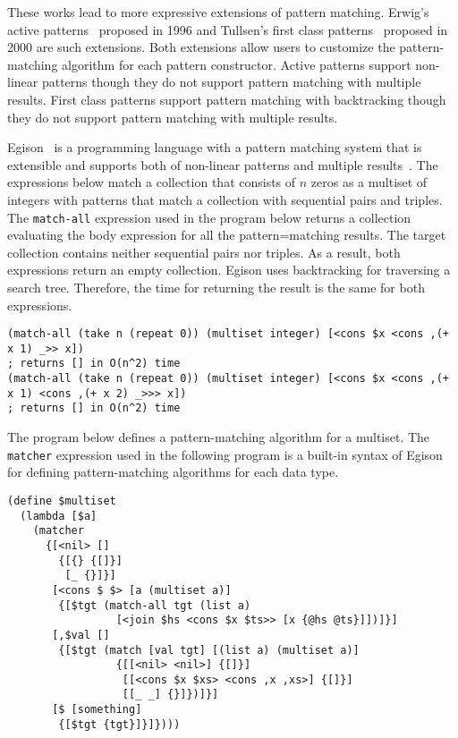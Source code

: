 \documentclass[acmlarge]{acmart}
\begin{document}
These works lead to more expressive extensions of pattern matching.
Erwig's active patterns~\cite{erwig1996active} proposed in 1996 and Tullsen's first class patterns~\cite{tullsen2000first} proposed in 2000 are such extensions.
Both extensions allow users to customize the pattern-matching algorithm for each pattern constructor.
Active patterns support non-linear patterns though they do not support pattern matching with multiple results.
First class patterns support pattern matching with backtracking though they do not support pattern matching with multiple results.

Egison~\cite{egisonWeb} is a programming language with a pattern matching system that is extensible and supports both of non-linear patterns and multiple results~\cite{egi2018aplas}.
The expressions below match a collection that consists of $n$ zeros as a multiset of integers with patterns that match a collection with sequential pairs and triples.
The \texttt{match-all} expression used in the program below returns a collection evaluating the body expression for all the pattern=matching results.
The target collection contains neither sequential pairs nor triples.
As a result, both expressions return an empty collection.
Egison uses backtracking for traversing a search tree.
Therefore, the time for returning the result is the same for both expressions.

\begin{lstlisting}[language=egison]
(match-all (take n (repeat 0)) (multiset integer) [<cons $x <cons ,(+ x 1) _>> x])
; returns [] in O(n^2) time
(match-all (take n (repeat 0)) (multiset integer) [<cons $x <cons ,(+ x 1) <cons ,(+ x 2) _>>> x])
; returns [] in O(n^2) time
\end{lstlisting}

\noindent The program below defines a pattern-matching algorithm for a multiset.
The \texttt{matcher} expression used in the following program is a built-in syntax of Egison for defining pattern-matching algorithms for each data type.

\begin{lstlisting}[language=egison]
(define $multiset
  (lambda [$a]
    (matcher
      {[<nil> []
        {[{} {[]}]
         [_ {}]}]
       [<cons $ $> [a (multiset a)]
        {[$tgt (match-all tgt (list a)
                 [<join $hs <cons $x $ts>> [x {@hs @ts}]])]}]
       [,$val []
        {[$tgt (match [val tgt] [(list a) (multiset a)]
                 {[[<nil> <nil>] {[]}]
                  [[<cons $x $xs> <cons ,x ,xs>] {[]}]
                  [[_ _] {}]})]}]
       [$ [something]
        {[$tgt {tgt}]}]})))
\end{lstlisting}
\end{document}
